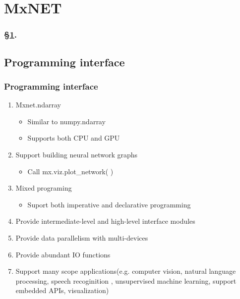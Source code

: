 
\section{MxNET}\label{sec:MxNet}


\frameinlbffalse

\begin{frame}[plain]
\frametitle{\S\ref{sec:MxNet}. \insertsection}
\listofframes
\end{frame}
\addtocounter{framenumber}{-1} %

\frameinlbftrue

\subsection{Programming interface}

\begin{frame}
  \MyLogo
  \frametitle{Programming interface}  

\begin{enumerate}
\item Mxnet.ndarray 
\begin{itemize}
\item Similar to numpy.ndarray
\item Supports both CPU and GPU
\end{itemize}

\item Support building neural network graphs
\begin{itemize}
\item Call mx.viz.plot\_network( )
\end{itemize}

\item Mixed programing
\begin{itemize}
\item Suport both imperative and declarative programming 
\end{itemize}
\item Provide intermediate-level and high-level interface modules

\item Provide data parallelism with multi-devices 
%
\item Provide abundant IO functions 
%
\item Support many scope applications(e.g. computer vision, natural language processing,  speech recoginition , unsupervised machine learning, support embedded APIs, visualization)

\end{enumerate}

\end{frame}

